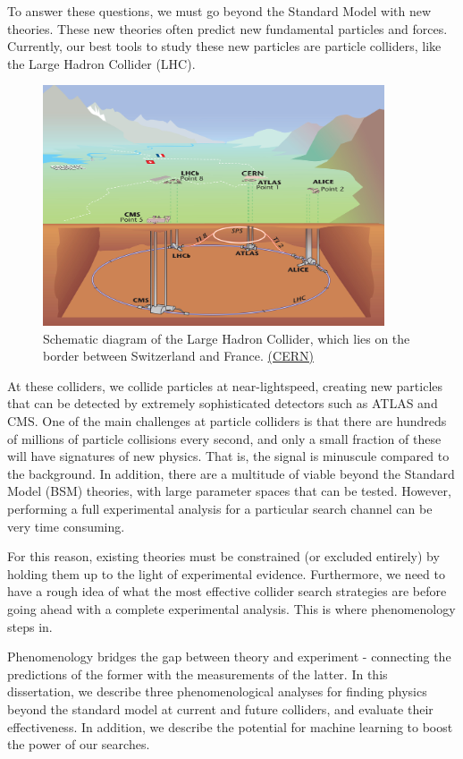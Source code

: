 To answer these questions, we must go beyond the Standard Model with new theories. These new theories often predict new fundamental particles and forces. Currently, our best tools to study these new particles are particle colliders, like the Large Hadron Collider (LHC).

\begin{figure}
  \centering
  \includegraphics[width=0.9\textwidth]{images/LHC}
  \caption{Schematic diagram of the Large Hadron Collider, which lies on the border between Switzerland and France. \href{http://cds.cern.ch/journal/CERNBulletin/2008/38/News\%20Articles/1125888?ln=en}{(CERN)}}
\end{figure}

At these colliders, we collide particles at near-lightspeed, creating new particles that can be detected by extremely sophisticated detectors such as ATLAS and CMS. One of the main challenges at particle colliders is that there are hundreds of millions of particle collisions every second, and only a small fraction of these will have signatures of new physics. That is, the signal is minuscule compared to the background. In addition, there are a multitude of viable beyond the Standard Model (BSM) theories, with large parameter spaces that can be tested. However, performing a full experimental analysis for a particular search channel can be very time consuming.

For this reason, existing theories must be constrained (or excluded entirely) by holding them up to the light of experimental evidence. Furthermore, we need to have a rough idea of what the most effective collider search strategies are before going ahead with a complete experimental analysis. This is where phenomenology steps in.

Phenomenology bridges the gap between theory and experiment - connecting the predictions of the former with the measurements of the latter. In this dissertation, we describe three phenomenological analyses for finding physics beyond the standard model at current and future colliders, and evaluate their effectiveness. In addition, we describe the potential for machine learning to boost the power of our searches.
